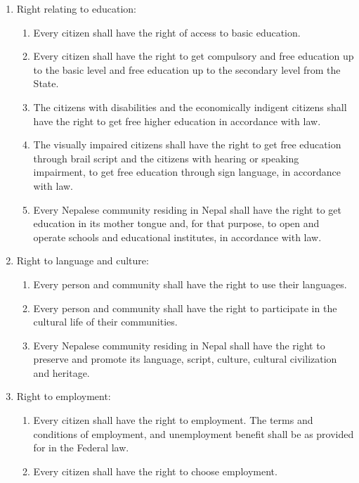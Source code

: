 \begin{questions}
\begin{solution}
\begin{enumerate}
\item Right relating to education:
\begin{enumerate}
    \item Every citizen shall have the right of access to basic education.
    \item Every citizen shall have the right to get compulsory and free education up to the basic level and free education up to the secondary level from the State.
    \item The citizens with disabilities and the economically indigent citizens shall have the right to get free higher education in accordance with law.
    \item The visually impaired citizens shall have the right to get free education through brail script and the citizens with hearing or speaking impairment, to get free education through sign language, in accordance with law.
    \item Every Nepalese community residing in Nepal shall have the right to get education in its mother tongue and, for that purpose, to open and operate schools and educational institutes, in accordance with law.
\end{enumerate}

\item Right to language and culture:
\begin{enumerate}
    \item Every person and community shall have the right to use their languages.
    \item Every person and community shall have the right to participate in the cultural life of their communities.
    \item Every Nepalese community residing in Nepal shall have the right to preserve and promote its language, script, culture, cultural civilization and heritage.
\end{enumerate}

\item Right to employment:
\begin{enumerate}
    \item Every citizen shall have the right to employment. The terms and conditions of employment, and unemployment benefit shall be as provided for in the Federal law.
    \item Every citizen shall have the right to choose employment.
\end{enumerate}


\end{enumerate}
\end{solution}
\end{questions}
